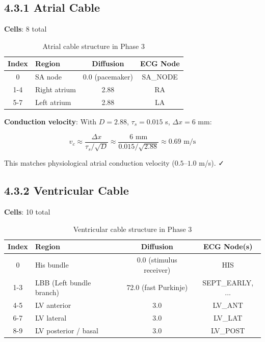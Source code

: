 \subsection{4.3.1 Atrial Cable}

\textbf{Cells}: 8 total

\begin{table}[H]
\centering
\begin{tabularx}{\textwidth}{|c|X|c|c|}
\hline
\textbf{Index} & \textbf{Region} & \textbf{Diffusion} & \textbf{ECG Node} \\
\hline
0 & SA node & 0.0 (pacemaker) & SA\_NODE \\
1-4 & Right atrium & 2.88 & RA \\
5-7 & Left atrium & 2.88 & LA \\
\hline
\end{tabularx}
\caption{Atrial cable structure in Phase 3}
\label{tab:atrial_cable}
\end{table}

\textbf{Conduction velocity}: With $D = 2.88$, $\tau_s = 0.015$ s, $\Delta x = 6$ mm:

\begin{equation}
v_c \approx \frac{\Delta x}{\tau_s / \sqrt{D}} \approx \frac{6 \text{ mm}}{0.015 / \sqrt{2.88}} \approx 0.69 \text{ m/s}
\end{equation}

This matches physiological atrial conduction velocity ($0.5$--$1.0$ m/s). ✓

\subsection{4.3.2 Ventricular Cable}

\textbf{Cells}: 10 total

\begin{table}[H]
\centering
\begin{tabularx}{\textwidth}{|c|X|c|c|}
\hline
\textbf{Index} & \textbf{Region} & \textbf{Diffusion} & \textbf{ECG Node(s)} \\
\hline
0 & His bundle & 0.0 (stimulus receiver) & HIS \\
1-3 & LBB (Left bundle branch) & 72.0 (fast Purkinje) & SEPT\_EARLY, ... \\
4-5 & LV anterior & 3.0 & LV\_ANT \\
6-7 & LV lateral & 3.0 & LV\_LAT \\
8-9 & LV posterior / basal & 3.0 & LV\_POST \\
\hline
\end{tabularx}
\caption{Ventricular cable structure in Phase 3}
\label{tab:ventricular_cable}
\end{table}

